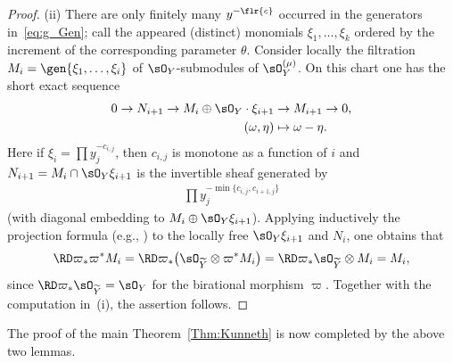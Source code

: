 \begin{proof}
(ii) There are only finitely many $y^{-\flr{c}}$ occurred in the generators in~\eqref{eq:g_Gen}; call the appeared (distinct) monomials $\xi_1,\dots,\xi_k$ ordered by the increment of the corresponding parameter $\theta$.
Consider locally the filtration $M_i = \gen{\xi_1,\dots,\xi_i}$ of $\sO_Y$-submodules of $\sO_Y^{(\mu)}$. On this chart one has the short exact sequence
\begin{align*}
0 \to N_{i+1} \to M_i\oplus \sO_Y\cdot\xi_{i+1} & \to M_{i+1} \to 0, \\
(\omega, \eta) & \mapsto \omega - \eta.
\end{align*}
Here if $\xi_i = \prod y_j^{-c_{i,j}}$, then $c_{i,j}$ is monotone as a function of $i$ and $N_{i+1} = M_i\cap \sO_Y\xi_{i+1}$ is the invertible sheaf generated by
\begin{gather*} \prod y_j^{-\min\{c_{i,j}, c_{i+1,j} \}} \end{gather*}
(with diagonal embedding to $M_i\oplus \sO_Y\xi_{i+1}$). Applying inductively the projection formula (e.g., \cite[Exercise~III.8.3]{H}) to the locally free $\sO_Y\xi_{i+1}$ and $N_i$, one obtains that
\begin{gather*} \RD\varpi_*\varpi^*M_i= \RD\varpi_*\big(\sO_{\widetilde{Y}}\otimes\varpi^*M_i\big)= \RD\varpi_*\sO_{\widetilde{Y}}\otimes M_i = M_i, \end{gather*}
since $\RD\varpi_*\sO_{\widetilde{Y}} = \sO_Y$ for the birational morphism $\varpi$. Together with the computation in~(i), the assertion follows.
\end{proof}

The proof of the main Theorem~\ref{Thm:Kunneth} is now completed by the above two lemmas.
